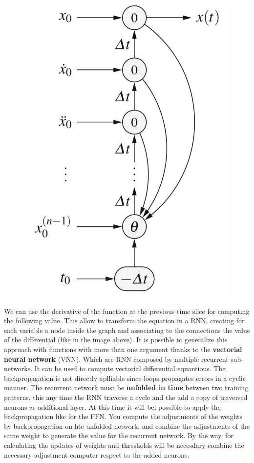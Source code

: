 \documentclass{article}
\begin{document}
\begin{figure}[H]
    \centering
    \includegraphics[scale=0.5]{images/RNN_diff_eq.png}
\end{figure}
We can use the derivative of the function at the previous time slice for computing the
following value. This allow to transform the equation in a RNN, creating for each
variable a node inside the graph and associating to the connections the value of the differential
(like in the image above).
\newline\newline
It is possible to generalize this approach with functions with more than one argument thanks
to the \textbf{vectorial neural network} (VNN). Which are RNN composed by multiple
recurrent sub-networks. It can be used to compute vectorial differential equantions.
The backpropagation is not directly aplliable since loops propagates errors in a cyclic manner.
The recurrent network must be \textbf{unfolded in time} between two training patterns, this
any time the RNN traverse a cycle and the add a copy of traversed neurons as additional layer.
\newline\newline
At this time it will bel possible to apply the backpropagation like for the FFN.
You compute the adjustments of the weights by backpropagation on hte unfolded network, and
combine the adjustments of the same weight to generate the value for the recurrent network.
\newline\newline
By the way, for calculating the updates of weights and thresholds will be necesdary combine the
necessary adjustment computer respect to the added neurons.
\end{document}
